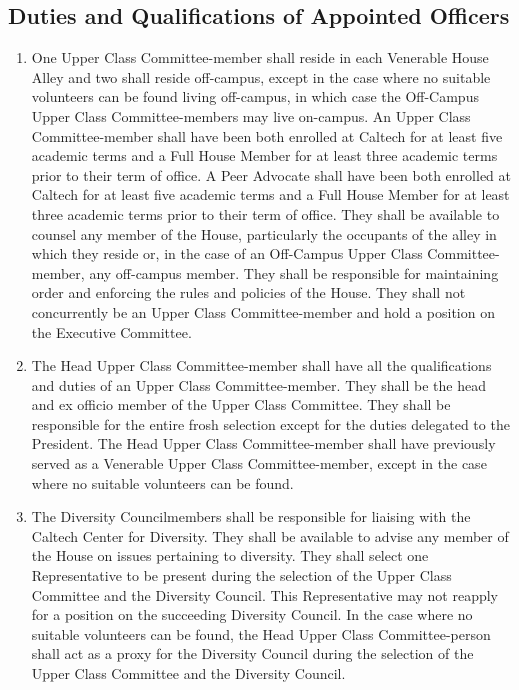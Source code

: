 \documentclass[10pt]{article} %
\begin{document}
\subsection{Duties and Qualifications of Appointed Officers}
\label{AppointedDuties}
\begin{enumerate}
\item One Upper Class Committee-member shall reside in each Venerable House Alley and two shall reside off-campus, except in the case where no suitable volunteers can be found living off-campus, in which case the Off-Campus Upper Class Committee-members may live on-campus. An Upper Class Committee-member shall have been both enrolled at Caltech for at least five academic terms and a Full House Member for at least three academic terms prior to their term of office. A Peer Advocate shall have been both enrolled at Caltech for at least five academic terms and a Full House Member for at least three academic terms prior to their term of office. They shall be available to counsel any member of the House, particularly the occupants of the alley in which they reside or, in the case of an Off-Campus Upper Class Committee-member, any off-campus member. They shall be responsible for maintaining order and enforcing the rules and policies of the House. They shall not concurrently be an Upper Class Committee-member and hold a position on the Executive Committee.
\item The Head Upper Class Committee-member shall have all the qualifications and duties of an Upper Class Committee-member. They shall be the head and ex officio member of the Upper Class Committee. They shall be responsible for the entire frosh selection except for the duties delegated to the President. The Head Upper Class Committee-member shall have previously served as a Venerable Upper Class Committee-member, except in the case where no suitable volunteers can be found.
\item The Diversity Councilmembers shall be responsible for liaising with the Caltech Center for Diversity. They shall be available to advise any member of the House on issues pertaining to diversity. They shall select one Representative to be present during the selection of the Upper Class Committee and the Diversity Council. This Representative may not reapply for a position on the succeeding Diversity Council. In the case where no suitable volunteers can be found, the Head Upper Class Committee-person shall act as a proxy for the Diversity Council during the selection of the Upper Class Committee and the Diversity Council.

\end{enumerate}
\end{document}
